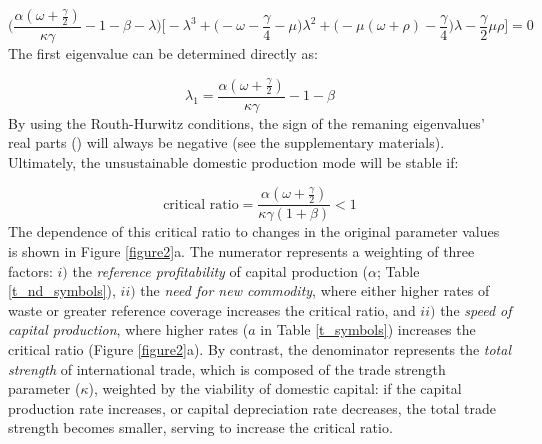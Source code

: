 \documentclass[12pt]{article}
\begin{document}
\begin{equation}
  \Big(\frac{\alpha(\omega + \frac{\gamma}{2})}{\kappa \gamma} - 1 - \beta - \lambda\Big) \Big[ - \lambda^3 + \big(-\omega - \frac{\gamma}{4} - \mu\big) \lambda^2 + \big(- \mu(\omega + \rho) - \frac{\gamma}{4}\big) \lambda - \frac{\gamma}{2} \mu \rho\Big] = 0
\end{equation}
%
The first eigenvalue can be determined directly as:

\begin{equation}
  \lambda_{1} = \frac{\alpha(\omega + \frac{\gamma}{2})}{\kappa \gamma} - 1 - \beta
\end{equation}
%
By using the Routh-Hurwitz conditions, the sign of the remaning eigenvalues' real parts (\cite{ottoday2011}) will always be negative (see the supplementary materials). Ultimately, the unsustainable domestic production mode will be stable if:

\begin{equation}
  \text{critical ratio} = \frac{ \alpha (\omega + \frac{\gamma}{2})}{\kappa \gamma(1+\beta)} < 1
\end{equation}
%
The dependence of this critical ratio to changes in the original parameter values is shown in Figure \ref{figure2}a. The numerator represents a weighting of three factors: $i)$ the \textit{reference profitability} of capital production ($\alpha$; Table \ref{t_nd_symbols}), $ii)$ the \textit{need for new commodity}, where either higher rates of waste or greater reference coverage increases the critical ratio, and $ii)$ the \textit{speed of capital production}, where higher rates ($a$ in Table \ref{t_symbols}) increases the critical ratio (Figure \ref{figure2}a). By contrast, the denominator represents the \textit{total strength} of international trade, which is composed of the trade strength parameter ($\kappa$), weighted by the viability of domestic capital: if the capital production rate increases, or capital depreciation rate decreases, the total trade strength becomes smaller, serving to increase the critical ratio.
\end{document}
